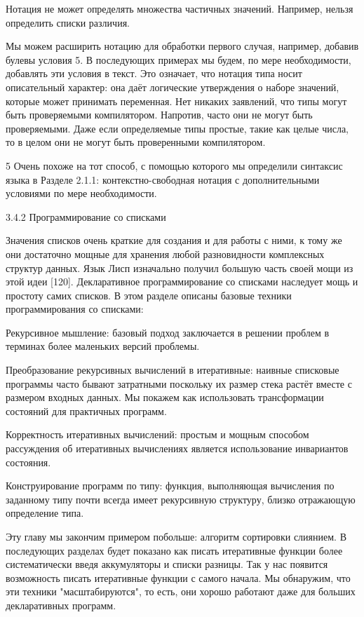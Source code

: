 Нотация не может определять множества частичных значений. Например, нельзя определить списки различия.

Мы можем расширить нотацию для обработки первого случая, например, добавив булевы условия 5. В последующих примерах мы будем, по мере необходимости, добавлять эти условия в текст.  Это означает, что нотация типа носит описательный характер: она даёт логические утверждения о наборе значений, которые может принимать переменная. Нет никаких заявлений, что типы могут быть проверяемыми компилятором. Напротив, часто они не могут быть проверяемыми. Даже если определяемые типы простые, такие как целые числа, то в целом они не могут быть проверенными компилятором.

5 Очень похоже на тот способ, с помощью которого мы определили синтаксис языка в Разделе 2.1.1: контекстно-свободная нотация с дополнительными условиями по мере необходимости.

3.4.2 Программирование со списками

Значения списков очень краткие для создания и для работы с ними, к тому же они достаточно мощные для хранения любой разновидности комплексных структур данных. Язык Лисп изначально получил большую часть своей мощи из этой идеи [120]. Декларативное программирование со списками наследует мощь и простоту самих списков. В этом разделе описаны базовые техники программирования со списками:

Рекурсивное мышление: базовый подход заключается в решении проблем в терминах более маленьких версий проблемы.

Преобразование рекурсивных вычислений в итеративные: наивные списковые программы часто бывают затратными поскольку их размер стека растёт вместе с размером входных данных. Мы покажем как использовать трансформации состояний для практичных программ.

Корректность итеративных вычислений: простым и мощным способом рассуждения об итеративных вычислениях является использование инвариантов состояния.

Конструирование программ по типу: функция, выполняющая вычисления по заданному типу почти всегда имеет рекурсивную структуру, близко отражающую определение типа.

Эту главу мы закончим примером побольше: алгоритм сортировки слиянием. В последующих разделах будет показано как писать итеративные функции более систематически введя аккумуляторы и списки разницы. Так у нас появится возможность писать итеративные функции с самого начала. Мы обнаружим, что эти техники "масштабируются", то есть, они хорошо работают даже для больших декларативных программ.

